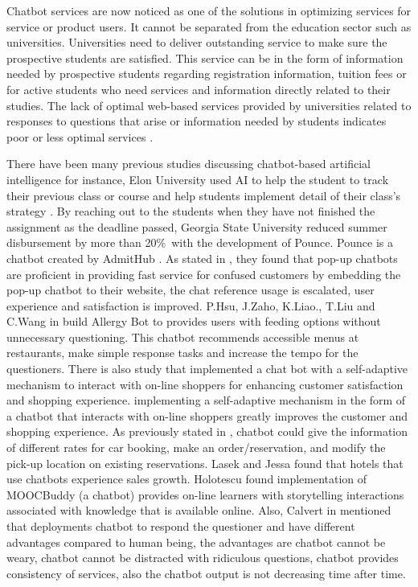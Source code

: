 \documentclass[conference]{IEEEtran}
\begin{document}
Chatbot services are now noticed as one of the solutions in optimizing services for service or product users. It cannot be separated from the education sector such as universities. Universities need to deliver outstanding service to make sure the prospective students are satisfied. This service can be in the form of information needed by prospective students regarding registration information, tuition fees or for active students who need services and information directly related to their studies. The lack of optimal web-based services provided by universities related to responses to questions that arise or information needed by students indicates poor or less optimal services \cite{b3}.

There have been many previous studies discussing chatbot-based artificial intelligence for instance, Elon University used AI to help the student to track their previous class or course and help students implement detail of their class's strategy \cite{b4}. By reaching out to the students when they have not finished the assignment as the deadline passed, Georgia State University reduced summer disbursement by more than 20\%\ with the development of Pounce. Pounce is a chatbot created by AdmitHub \cite{b5}. As stated in \cite{b6}, they found that pop-up chatbots are proficient in providing fast service for confused customers by embedding the pop-up chatbot to their website, the chat reference usage is escalated, user experience and satisfaction is improved. P.Hsu, J.Zaho, K.Liao., T.Liu and C.Wang in \cite{b7} build Allergy Bot to provides users with feeding options without unnecessary questioning. This chatbot recommends accessible menus at restaurants, make simple response tasks and increase the tempo for the questioners. There is also study that implemented a chat bot with a self-adaptive mechanism  \cite{b8} to interact with on-line shoppers for enhancing customer satisfaction and shopping experience. implementing a self-adaptive mechanism in the form of a chatbot that interacts with on-line shoppers greatly improves the customer and shopping experience. As previously stated in \cite{b9}, chatbot could give the information of different rates for car booking, make an order/reservation, and modify the pick-up location on existing reservations. Lasek and Jessa \cite{b10} found that hotels that use chatbots experience sales growth. Holotescu \cite{b11} found implementation of MOOCBuddy (a chatbot) provides on-line learners with storytelling interactions associated with knowledge that is available online. Also, Calvert in \cite{b12} mentioned that deployments chatbot to respond the questioner and have different advantages compared to human being, the advantages are chatbot cannot be weary, chatbot cannot be distracted with ridiculous questions, chatbot provides consistency of services, also the chatbot output is not decreasing time after time. 
\end{document}
